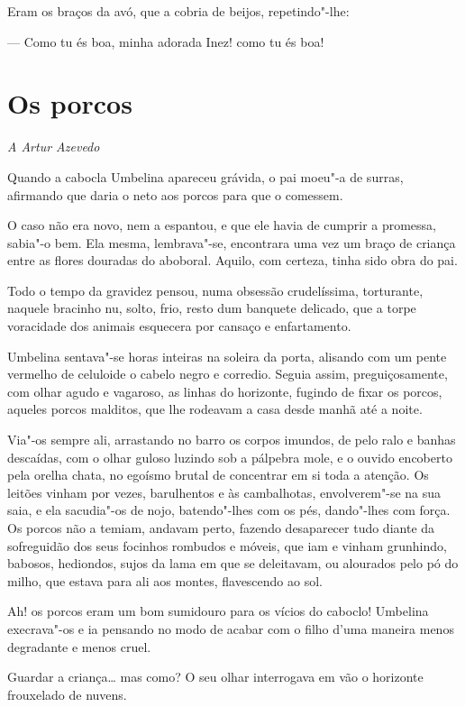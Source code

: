 Eram os braços da avó, que a cobria de beijos, repetindo"-lhe:

--- Como tu és boa, minha adorada Inez! como tu és boa!

\chapter{Os porcos}

\hfill{}\emph{A Artur Azevedo}

\bigskip

Quando a cabocla Umbelina apareceu grávida, o pai moeu"-a de surras,
afirmando que daria o neto aos porcos para que o comessem.

O caso não era novo, nem a espantou, e que ele havia de cumprir a
promessa, sabia"-o bem. Ela mesma, lembrava"-se, encontrara uma vez um
braço de criança entre as flores douradas do aboboral. Aquilo, com
certeza, tinha sido obra do pai.

Todo o tempo da gravidez pensou, numa obsessão crudelíssima, torturante,
naquele bracinho nu, solto, frio, resto dum banquete delicado, que a
torpe voracidade dos animais esquecera por cansaço e enfartamento.

Umbelina sentava"-se horas inteiras na soleira da porta, alisando com um
pente vermelho de celuloide o cabelo negro e corredio. Seguia assim,
preguiçosamente, com olhar agudo e vagaroso, as linhas do horizonte,
fugindo de fixar os porcos, aqueles porcos malditos, que lhe rodeavam a
casa desde manhã até a noite.

Via"-os sempre ali, arrastando no barro os corpos imundos, de pelo ralo e
banhas descaídas, com o olhar guloso luzindo sob a pálpebra mole, e o
ouvido encoberto pela orelha chata, no egoísmo brutal de concentrar em
si toda a atenção. Os leitões vinham por vezes, barulhentos e às
cambalhotas, envolverem"-se na sua saia, e ela sacudia"-os de nojo,
batendo"-lhes com os pés, dando"-lhes com força. Os porcos não a temiam,
andavam perto, fazendo desaparecer tudo diante da sofreguidão dos seus
focinhos rombudos e móveis, que iam e vinham grunhindo, babosos,
hediondos, sujos da lama em que se deleitavam, ou alourados pelo pó do
milho, que estava para ali aos montes, flavescendo ao sol.

Ah! os porcos eram um bom sumidouro para os vícios do caboclo! Umbelina
execrava"-os e ia pensando no modo de acabar com o filho d'uma maneira
menos degradante e menos cruel.

Guardar a criança\ldots{} mas como? O seu olhar interrogava em vão o
horizonte frouxelado de nuvens.

